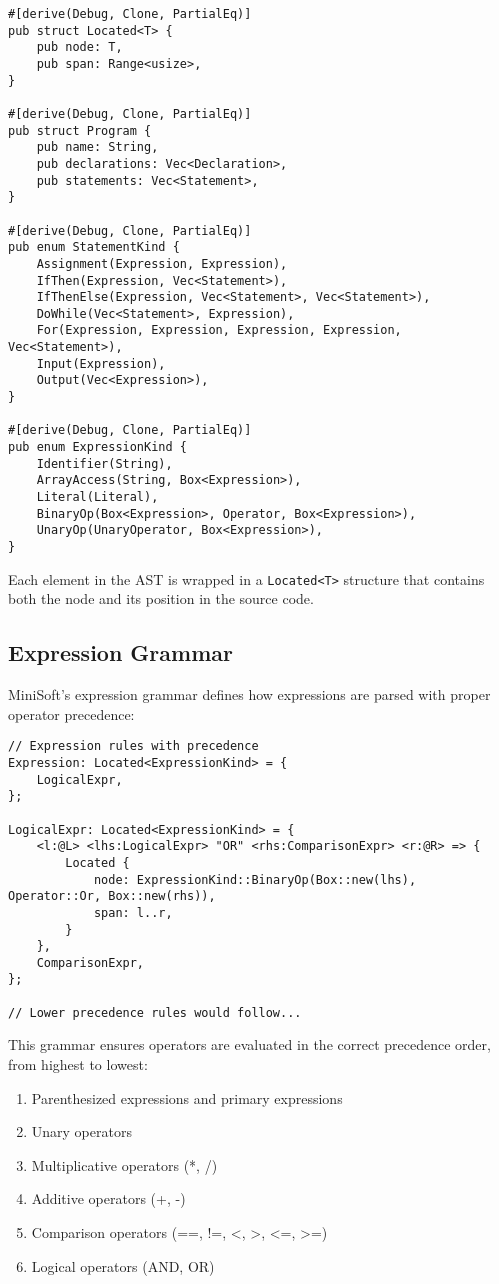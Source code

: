 \documentclass[12pt,a4paper]{article}
\begin{document}
\begin{lstlisting}[caption={Core AST Structures}]
#[derive(Debug, Clone, PartialEq)]
pub struct Located<T> {
    pub node: T,
    pub span: Range<usize>,
}

#[derive(Debug, Clone, PartialEq)]
pub struct Program {
    pub name: String,
    pub declarations: Vec<Declaration>,
    pub statements: Vec<Statement>,
}

#[derive(Debug, Clone, PartialEq)]
pub enum StatementKind {
    Assignment(Expression, Expression),
    IfThen(Expression, Vec<Statement>),
    IfThenElse(Expression, Vec<Statement>, Vec<Statement>),
    DoWhile(Vec<Statement>, Expression),
    For(Expression, Expression, Expression, Expression, Vec<Statement>),
    Input(Expression),
    Output(Vec<Expression>),
}

#[derive(Debug, Clone, PartialEq)]
pub enum ExpressionKind {
    Identifier(String),
    ArrayAccess(String, Box<Expression>),
    Literal(Literal),
    BinaryOp(Box<Expression>, Operator, Box<Expression>),
    UnaryOp(UnaryOperator, Box<Expression>),
}
\end{lstlisting}

Each element in the AST is wrapped in a \texttt{Located<T>} structure that contains both the node and its position in the source code.

\subsection{Expression Grammar}
MiniSoft's expression grammar defines how expressions are parsed with proper operator precedence:

\begin{lstlisting}[caption={Expression Grammar Example}]
// Expression rules with precedence
Expression: Located<ExpressionKind> = {
    LogicalExpr,
};

LogicalExpr: Located<ExpressionKind> = {
    <l:@L> <lhs:LogicalExpr> "OR" <rhs:ComparisonExpr> <r:@R> => {
        Located {
            node: ExpressionKind::BinaryOp(Box::new(lhs), Operator::Or, Box::new(rhs)),
            span: l..r,
        }
    },
    ComparisonExpr,
};

// Lower precedence rules would follow...
\end{lstlisting}

This grammar ensures operators are evaluated in the correct precedence order, from highest to lowest:
\begin{enumerate}
	\item Parenthesized expressions and primary expressions
	\item Unary operators
	\item Multiplicative operators (*, /)
	\item Additive operators (+, -)
	\item Comparison operators (==, !=, <, >, <=, >=)
	\item Logical operators (AND, OR)
\end{enumerate}
\end{document}
